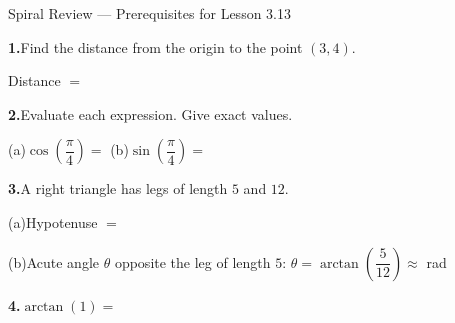 \documentclass[10pt]{article}
\begin{document}
\namedateperiod

\vspace{0.10in}

\begin{notesbox}{Spiral Review --- Prerequisites for Lesson 3.13}

\textbf{1.}\quad Find the distance from the origin to the point $(3, 4)$.

\vspace{4pt}
Distance $= $ \blank{4cm}

\vspace{0.14in}
\textbf{2.}\quad Evaluate each expression. Give exact values.

\vspace{4pt}
(a)\quad $\cos\!\left(\dfrac{\pi}{4}\right) = $ \blank{2.5cm}
\hspace{1.5cm}
(b)\quad $\sin\!\left(\dfrac{\pi}{4}\right) = $ \blank{2.5cm}

\vspace{0.14in}
\textbf{3.}\quad A right triangle has legs of length $5$ and $12$.

\vspace{4pt}
(a)\quad Hypotenuse $= $ \blank{3cm}

\vspace{4pt}
(b)\quad Acute angle $\theta$ opposite the leg of length $5$:\quad
$\theta = \arctan\!\left(\dfrac{5}{12}\right) \approx$ \blank{2.5cm} rad

\vspace{0.14in}
\textbf{4.}\quad $\arctan(1) = $ \blank{2.5cm}

\end{notesbox}
\end{document}
